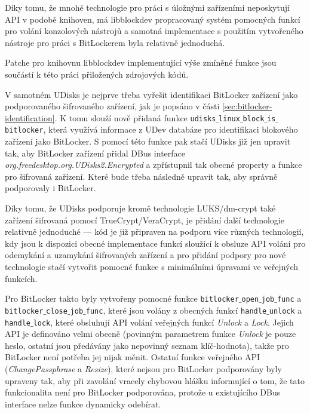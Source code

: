 Díky tomu, že mnohé technologie pro práci s úložnými zařízeními neposkytují API v podobě knihoven, má libblockdev propracovaný systém pomocných funkcí pro volání konzolových nástrojů a samotná implementace s použitím vytvořeného nástroje pro práci s BitLockerem byla relativně jednoduchá.

Patche pro knihovnu libblockdev implementující výše zmíněné funkce jsou součástí k této práci přiložených zdrojových kódů.

\label{sec:udisks-implementation}

V samotném UDisks je nejprve třeba vyřešit identifikaci BitLocker zařízení jako podporovaného šifrovaného zařízení, jak je popsáno v části \ref{sec:bitlocker-identification}. K tomu slouží nově přidaná funkce \texttt{udisks$\_$linux$\_$block$\_$is$\_$bitlocker}, která využívá informace z UDev databáze pro identifikaci blokového zařízení jako BitLocker. S pomocí této funkce pak stačí UDisks již jen upravit tak, aby BitLocker zařízení přidal DBus interface \emph{org.freedesktop.org.UDisks2.Encrypted} a zpřístupnil tak obecné property a funkce pro šifrovaná zařízení. Které bude třeba následně upravit tak, aby správně podporovaly i BitLocker.

Díky tomu, že UDisks podporuje kromě technologie LUKS/dm-crypt také zařízení šifrovaná pomocí TrueCrypt/VeraCrypt, je přidání další technologie relativně jednoduché --- kód je již připraven na podporu více různých technologií, kdy jsou k dispozici obecné implementace funkcí sloužící k obsluze API volání pro odemykání a uzamykání šifrovaných zařízení a pro přidání podpory pro nové technologie stačí vytvořit pomocné funkce s minimálními úpravami ve veřejných funkcích.

Pro BitLocker takto byly vytvořeny pomocné funkce \texttt{bitlocker$\_$open$\_$job$\_$func} a \texttt{bitlocker$\_$close$\_$job$\_$func}, které jsou volány z obecných funkcí \texttt{handle$\_$unlock} a \texttt{handle$\_$lock}, které obsluhují API volání veřejných funkcí \emph{Unlock} a \emph{Lock}. Jejich API je definováno velmi obecně (povinným parametrem funkce \emph{Unlock} je pouze heslo, ostatní jsou předávány jako nepovinný seznam klíč-hodnota\cite{Storaged2019}), takže pro BitLocker není potřeba jej nijak měnit. Ostatní funkce veřejného API (\emph{ChangePassphrase} a \emph{Resize}), které nejsou pro BitLocker podporovány byly upraveny tak, aby při zavolání vracely chybovou hlášku informující o tom, že tato funkcionalita není pro BitLocker podporována, protože u existujícího DBus interface nelze funkce dynamicky odebírat.

